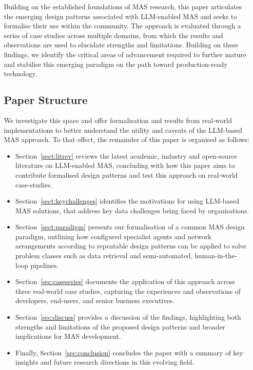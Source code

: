 \documentclass{article}
\begin{document}
Building on the established foundations of MAS research, this paper articulates the emerging design patterns associated with LLM-enabled MAS and seeks to formalise their use within the community. The approach is evaluated through a series of case studies across multiple domains, from which the results and observations are used to elucidate strengths and limitations. Building on these findings, we identify the critical areas of advancement required to further mature and stabilise this emerging paradigm on the path toward production-ready technology.

\subsection{Paper Structure}

We investigate this space and offer formalisation and results from real-world implementations to better understand the utility and caveats of the LLM-based MAS approach. To that effect, the remainder of this paper is organised as follows:
\begin{itemize}
    \item Section~\ref{sect:litrev} reviews the latest academic, industry and open-source literature on LLM-enabled MAS, concluding with how this paper aims to contribute formalised design patterns and test this approach on real-world case-studies.
    \item Section~\ref{sect:keychallenges} identifies the motivations for using LLM-based MAS solutions, that address key data challenges being faced by organisations.
    \item Section~\ref{sect:paradigm} presents our formalisation of a common MAS design paradigm, outlining how configured specialist agents and network arrangements according to repeatable design patterns can be applied to solve problem classes such as data retrieval and semi-automated, human-in-the-loop pipelines.
    \item Section~\ref{sec:caseseries} documents the application of this approach across three real-world case studies, capturing the experiences and observations of developers, end-users, and senior business executives.
    \item Section~\ref{sec:discuss} provides a discussion of the findings, highlighting both strengths and limitations of the proposed design patterns and broader implications for MAS development.
    \item Finally, Section~\ref{sec:conclusion} concludes the paper with a summary of key insights and future research directions in this evolving field.
\end{itemize}
\end{document}

